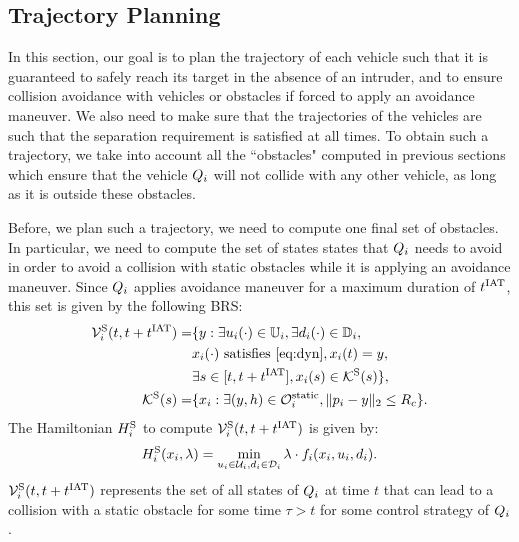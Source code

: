 \subsection{Trajectory Planning} \label{sec:path_planning}
In this section, our goal is to plan the trajectory of each vehicle such that it is guaranteed to safely reach its target in the absence of an intruder, and to ensure collision avoidance with vehicles or obstacles if forced to apply an avoidance maneuver. We also need to make sure that the trajectories of the vehicles are such that the separation requirement is satisfied at all times. To obtain such a trajectory, we take into account all the ``obstacles" computed in previous sections which ensure that the vehicle $Q_i$ will not collide with any other vehicle, as long as it is outside these obstacles.   

Before, we plan such a trajectory, we need to compute one final set of obstacles. In particular, we need to compute the set of states states that $Q_i$ needs to avoid in order to avoid a collision with static obstacles while it is applying an avoidance maneuver. Since $Q_i$ applies avoidance maneuver for a maximum duration of $t^\text{IAT}$, this set is given by the following BRS:
\begin{equation} \label{eq:ObsBRS_static}
\begin{aligned}
\brs^{\text{S}}_{i}(t, t+\iat) = & \{y: \exists \ctrl_i(\cdot) \in \cfset_i, \exists \dstb_i(\cdot) \in \dfset_i, \\
& \state_i(\cdot) \text{ satisfies \eqref{eq:dyn}}, \state_i(t) = y, \\
& \exists s \in [t, t+\iat], \state_i(s) \in \mathcal{K}^{\text{S}}(s) \},\\
\mathcal{K}^{\text{S}}(s) = & \{\state_i: \exists (y, h) \in \soset_i, \|\pos_i - y\|_2 \le \rc \}.
\end{aligned}
\end{equation}
The Hamiltonian $H^{\text{S}}_{i}$ to compute $\mathcal{V}^{\text{S}}_{i}(t, t+t^\text{IAT})$ is given by:
\begin{equation} \label{eqn:BRS_obsham_static}
\ham^{\text{S}}_{i}(\state_i, \costate) = \min_{\ctrl_i \in \cset_i, \dstb_i \in \dset_i} \costate \cdot f_i (\state_i, \ctrl_i, \dstb_i).
\end{equation}
$\mathcal{V}^{\text{S}}_{i}(t, t+t^\text{IAT})$ represents the set of all states of $Q_i$ at time $t$ that can lead to a collision with a static obstacle for some time $\tau > t$ for some control strategy of $Q_i$.

